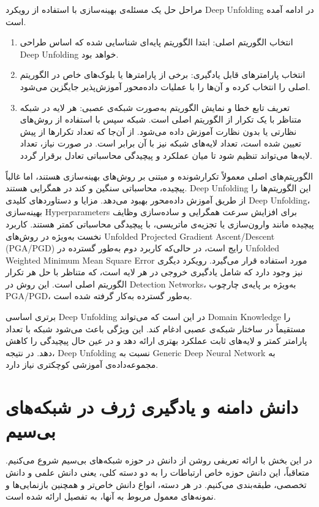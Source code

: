 مراحل حل یک مسئله‌ی بهینه‌سازی با استفاده از رویکرد
\gls{Deep Unfolding}
در ادامه آمده است.
\begin{enumerate}
	\item 
انتخاب الگوریتم اصلی: ابتدا الگوریتم پایه‌ای شناسایی شده که اساس طراحی 
\gls{Deep Unfolding}
 خواهد بود.
\item
انتخاب پارامترهای قابل یادگیری:
برخی از پارامترها یا بلوک‌های خاص در الگوریتم اصلی را انتخاب کرده و آن‌ها را با عملیات داده‌محور آموزش‌پذیر جایگزین می‌شود.
\item
تعریف تابع خطا و نمایش الگوریتم به‌صورت شبکه‌ی عصبی:
هر لایه در شبکه متناظر با یک تکرار از الگوریتم اصلی است. شبکه سپس با استفاده از روش‌های نظارتی یا بدون نظارت آموزش داده می‌شود. از آن‌جا که تعداد تکرارها از پیش تعیین شده است، تعداد لایه‌های شبکه نیز با آن برابر است. در صورت نیاز، تعداد لایه‌ها می‌تواند تنظیم شود تا میان عملکرد و پیچیدگی محاسباتی تعادل برقرار گردد.
\end{enumerate}
الگوریتم‌های اصلی معمولاً تکرارشونده و مبتنی بر روش‌های بهینه‌سازی هستند، اما غالباً پیچیده، محاسباتی سنگین و کند در همگرایی هستند. 
\gls{Deep Unfolding}
 این الگوریتم‌ها را از طریق آموزش داده‌محور بهبود می‌دهد. مزایا و دستاوردهای کلیدی 
\gls{Deep Unfolding}،
بهینه‌سازی
\glspl{Hyperparameter}
 برای افزایش سرعت همگرایی و ساده‌سازی وظایف پیچیده مانند وارون‌سازی یا تجزیه‌ی ماتریسی، با پیچیدگی محاسباتی کمتر هستند.
کاربرد نخست به‌ویژه در روش‌های
\gls{Unfolded Projected Gradient Ascent/Descent}
(\gls{PGA}/\gls{PGD})
 رایج است، در حالی‌که کاربرد دوم به‌طور گسترده در 
\gls{Unfolded Weighted Minimum Mean Square Error}
  مورد استفاده قرار می‌گیرد. رویکرد دیگری نیز وجود دارد که شامل یادگیری خروجی در هر لایه است، که متناظر با حل هر تکرار الگوریتم اصلی است. این روش در 
\glspl{Detection Network}،
 به‌ویژه بر پایه‌ی چارچوب PGA/PGD، به‌طور گسترده به‌کار گرفته شده است.

برتری اساسی 
\gls{Deep Unfolding}
 در این است که می‌تواند
\gls{Domain Knowledge}
  را مستقیماً در ساختار شبکه‌ی عصبی ادغام کند. این ویژگی باعث می‌شود شبکه با تعداد پارامتر کمتر و لایه‌های ثابت عملکرد بهتری ارائه دهد و در عین حال پیچیدگی را کاهش دهد.
در نتیجه، 
\gls{Deep Unfolding}
نسبت به 
\gls{Generic Deep Neural Network}
به مجموعه‌داده‌ی آموزشی کوچکتری نیاز دارد.

\section{دانش دامنه و یادگیری ژرف در شبکه‌های بی‌سیم}
در این بخش با ارائه تعریفی روشن از دانش در حوزه شبکه‌های بی‌سیم شروع می‌کنیم. متعاقباً، این دانش حوزه خاص ارتباطات را به دو دسته کلی، یعنی دانش علمی و دانش تخصصی، طبقه‌بندی می‌کنیم. در هر دسته، انواع دانش خاص‌تر و همچنین بازنمایی‌ها و نمونه‌های معمول مربوط به آنها، به تفصیل ارائه شده است.

